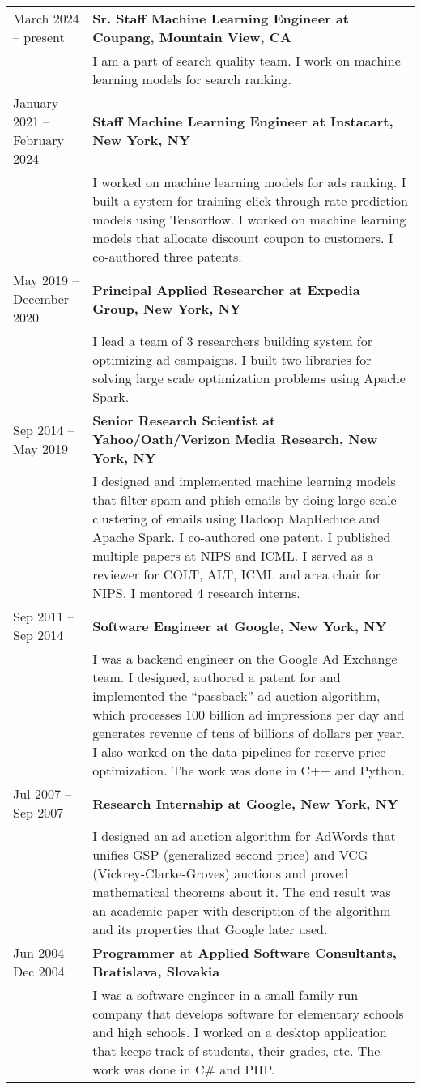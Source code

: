 \documentclass[9pt]{article}
\newcommand{\smallfont}{\small}
\begin{document}
\begin{longtable}{@{}lp{13cm}}
March 2024 -- present & \textbf{Sr. Staff Machine Learning Engineer at Coupang, Mountain View, CA} \\
& {\smallfont I am a part of search quality team. I work on machine learning models for search ranking.}
\\[0.3cm]
January 2021 -- February 2024 & \textbf{Staff Machine Learning Engineer at Instacart, New York, NY} \\
& {\smallfont I worked on
machine learning models for ads ranking. I built a system for training
click-through rate prediction models using Tensorflow. I worked on machine
learning models that allocate discount coupon to customers. I co-authored
three patents.}
\\[0.3cm]
May 2019 -- December 2020 & \textbf{Principal Applied Researcher at Expedia Group, New York, NY} \\
& {\smallfont I lead a team of 3 researchers building system for optimizing ad campaigns.
I built two libraries for solving large scale optimization problems using Apache Spark.}
\\[0.3cm]
Sep 2014 -- May 2019 & \textbf{Senior Research Scientist at Yahoo/Oath/Verizon Media Research, New York, NY} \\
& {\smallfont I designed and implemented machine learning models that filter
spam and phish emails by doing large scale clustering of emails using Hadoop
MapReduce and Apache Spark. I co-authored one patent. I published multiple
papers at NIPS and ICML. I served as a reviewer for COLT, ALT, ICML and area
chair for NIPS. I mentored 4 research interns.}
\\[0.3cm]
Sep 2011 -- Sep 2014 & \textbf{Software Engineer at Google, New York, NY} \\
& {\smallfont I was a backend engineer on the Google Ad Exchange team. I
designed, authored a patent for and implemented the ``passback'' ad auction
algorithm, which processes 100 billion ad impressions per day and generates
revenue of tens of billions of dollars per year. I also worked on the data
pipelines for reserve price optimization. The work was done in C++ and Python.}
\\[0.3cm]
Jul 2007 -- Sep 2007 & \textbf{Research Internship at Google, New York, NY} \\
& {\smallfont I designed an ad auction algorithm for AdWords that unifies GSP
(generalized second price) and VCG (Vickrey-Clarke-Groves) auctions and proved
mathematical theorems about it. The end result was an academic paper with description
of the algorithm and its properties that Google later used.}
\\[0.3cm]
Jun 2004 -- Dec 2004 & \textbf{Programmer at Applied Software Consultants, Bratislava, Slovakia} \\
& {\smallfont I was a software engineer in a small family-run company that
develops software for elementary schools and high schools. I worked on a desktop
application that keeps track of students, their grades, etc. The work was done in
C\# and PHP.}
\end{longtable}
\end{document}
